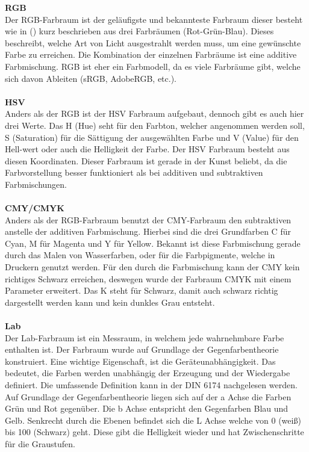 \documentclass[a4paper,12pt,oneside]{article}
\begin{document}
\textbf{RGB}\label{s.rgb}\\
Der RGB-Farbraum ist der geläufigste und bekannteste Farbraum dieser besteht wie in () kurz beschrieben aus drei Farbräumen (Rot-Grün-Blau). Dieses beschreibt, welche Art von Licht ausgestrahlt werden muss, um eine gewünschte Farbe zu erreichen. Die Kombination der einzelnen Farbräume ist eine additive Farbmischung. RGB ist eher ein Farbmodell, da es viele Farbräume gibt, welche sich davon Ableiten (sRGB, AdobeRGB, etc.).\\\\
\textbf{HSV}\label{s.hsv}\\
Anders als der RGB ist der HSV Farbraum aufgebaut, dennoch gibt es auch hier drei Werte. Das H (Hue) seht für den Farbton, welcher angenommen werden soll, S (Saturation) für die Sättigung der ausgewählten Farbe und V (Value) für den Hell-wert oder auch die Helligkeit der Farbe. Der HSV Farbraum besteht aus diesen Koordinaten. Dieser Farbraum ist gerade in der Kunst beliebt, da die Farbvorstellung besser funktioniert als bei additiven und subtraktiven Farbmischungen.\\\\
\textbf{CMY/CMYK}\label{s.cmy}\\
Anders als der RGB-Farbraum benutzt der CMY-Farbraum den subtraktiven anstelle der additiven Farbmischung. Hierbei sind die drei Grundfarben C für Cyan, M für Magenta und Y für Yellow. Bekannt ist diese Farbmischung gerade durch das Malen von Wasserfarben, oder für die Farbpigmente, welche in Druckern genutzt werden. Für den durch die Farbmischung kann der CMY kein richtiges Schwarz erreichen, deswegen wurde der Farbraum CMYK mit einem Parameter erweitert. Das K steht für Schwarz, damit auch schwarz richtig dargestellt werden kann und kein dunkles Grau entsteht.\\\\
\textbf{Lab}\label{s.lab}\\
Der Lab-Farbraum ist ein Messraum, in welchem jede wahrnehmbare Farbe enthalten ist. Der Farbraum wurde auf Grundlage der Gegenfarbentheorie konstruiert. Eine wichtige Eigenschaft, ist die Geräteunabhängigkeit. Das bedeutet, die Farben werden unabhängig der Erzeugung und der Wiedergabe definiert. Die umfassende Definition kann in der DIN 6174 nachgelesen werden. Auf Grundlage der Gegenfarbentheorie liegen sich auf der a Achse die Farben Grün und Rot gegenüber. Die b Achse entspricht den Gegenfarben Blau und Gelb. Senkrecht durch die Ebenen befindet sich die L Achse welche von 0 (weiß) bis 100 (Schwarz) geht. Diese gibt die Helligkeit wieder und hat Zwischenschritte für die Graustufen.
\end{document}
